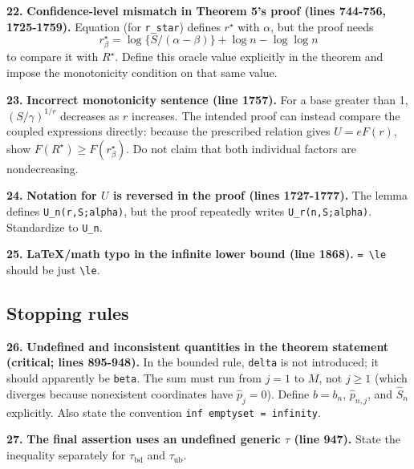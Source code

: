 \documentclass[10pt,a4paper]{article}
\begin{document}
\par\medskip\noindent\textbf{22.} \textbf{Confidence-level mismatch in Theorem 5's proof (lines 744-756, 1725-1759).} Equation (for \texttt{r\_\allowbreak{}star}) defines \(r^\star\) with \(\alpha\), but the proof needs
\[
    r_\beta^\star=\log\{S/(\alpha-\beta)\}+\log n-\log\log n
\]
to compare it with \(R^\star\). Define this oracle value explicitly in the theorem and impose the monotonicity condition on that same value.

\par\medskip\noindent\textbf{23.} \textbf{Incorrect monotonicity sentence (line 1757).} For a base greater than 1, \((S/\gamma)^{1/r}\) decreases as \(r\) increases. The intended proof can instead compare the coupled expressions directly: because the prescribed relation gives \(U=eF(r)\), show \(F(R^\star)\ge F(r_\beta^\star)\). Do not claim that both individual factors are nondecreasing.

\par\medskip\noindent\textbf{24.} \textbf{Notation for \(U\) is reversed in the proof (lines 1727-1777).} The lemma defines \texttt{U\_\allowbreak{}n(r,S;alpha)}, but the proof repeatedly writes \texttt{U\_\allowbreak{}r(n,S;alpha)}. Standardize to \texttt{U\_\allowbreak{}n}.

\par\medskip\noindent\textbf{25.} \textbf{LaTeX/math typo in the infinite lower bound (line 1868).} \texttt{= \textbackslash{}\allowbreak{}le} should be just \texttt{\textbackslash{}\allowbreak{}le}.

\subsection*{Stopping rules}

\par\medskip\noindent\textbf{26.} \textbf{Undefined and inconsistent quantities in the theorem statement (critical; lines 895-948).} In the bounded rule, \texttt{delta} is not introduced; it should apparently be \texttt{beta}. The sum must run from \(j=1\) to \(M\), not \(j\ge1\) (which diverges because nonexistent coordinates have \(\hat p_j=0\)). Define \(b=b_n\), \(\hat p_{n,j}\), and \(\hat S_n\) explicitly. Also state the convention \texttt{inf emptyset = infinity}.

\par\medskip\noindent\textbf{27.} \textbf{The final assertion uses an undefined generic \(\tau\) (line 947).} State the inequality separately for \(\tau_{\mathrm{bd}}\) and \(\tau_{\mathrm{ub}}\).
\end{document}
